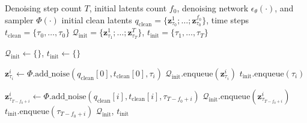 \documentclass{article}
\theoremstyle{plain}
\theoremstyle{definition}
\theoremstyle{remark}
\begin{document}
\begin{algorithm}[htbp]
\caption{Initial latents construction in FIFO-Diffusion}
\label{alg:fifo_initial_latent}
\begin{algorithmic}[1]

 Denoising step count $T$, initial latents count $f_0$, denoising network $\epsilon_{\theta}(\cdot)$, and sampler $\Phi(\cdot)$
 initial clean latents 
$q_\mathrm{clean}=\{\mathbf{z}_{\tau_0}^1; \ldots; \mathbf{z}_{\tau_0}^{f_0}\}$,
time steps $t_\mathrm{clean}=\{\tau_0,\dots,\tau_0\}$
$\mathcal{Q}_\mathrm{init}=\{\mathbf{z}_{\tau_1}^1;\dots;\mathbf{z}_{\tau_T}^T\}$,
$t_\mathrm{init}=\{\tau_1,\dots,\tau_T\}$

\STATE $\mathcal{Q}_\mathrm{init} \gets \{\}$, $t_\mathrm{init} \gets \{\}$

\STATE {\bfseries \textcolor{blue}{\# Initialize the early latents using the first frame}}

    \STATE $\mathbf{z}_{\tau_i}^i \gets \Phi.\mathrm{add\_noise}(q_\mathrm{clean}[0], t_\mathrm{clean}[0], \tau_i)$
    \STATE $\mathcal{Q}_\mathrm{init}.\text{enqueue}(\mathbf{z}_{\tau_i}^i)$
    \STATE $t_\mathrm{init}.\text{enqueue}(\tau_i)$
\ENDFOR

\STATE {\bfseries \textcolor{blue}{\# Manually add noise to the initial latents}}

    \STATE $\mathbf{z}_{\tau_{T-f_0+i}}^i \gets
    \Phi.\mathrm{add\_noise}(q_\mathrm{clean}[i], t_\mathrm{clean}[i], \tau_{T-f_0+i})$
    \STATE $\mathcal{Q}_\mathrm{init}.\text{enqueue}(\mathbf{z}_{\tau_{T-f_0+i}}^i)$
    \STATE $t_\mathrm{init}.\text{enqueue}(\tau_{T-f_0+i})$
\ENDFOR
{} $\mathcal{Q}_\mathrm{init}$, $t_\mathrm{init}$
\end{algorithmic}
\end{algorithm}


\end{document}

